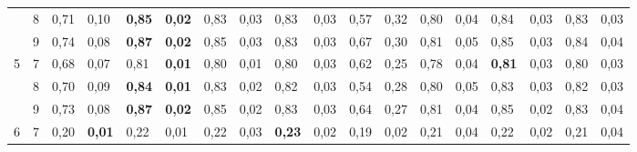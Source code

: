 \documentclass[conference]{IEEEtran}
\begin{document}
\begin{table}[]
\begin{tabular}{|cl|ll|ll|ll|ll|ll|ll|ll|ll|}
		\multicolumn{1}{|c|}{}                    & 8 & \multicolumn{1}{l|}{0,71} & 0,10          & \multicolumn{1}{l|}{\textbf{0,85}} & \textbf{0,02} & \multicolumn{1}{l|}{0,83}          & 0,03 & \multicolumn{1}{l|}{0,83}          & 0,03 & \multicolumn{1}{l|}{0,57}                 & 0,32 & \multicolumn{1}{l|}{0,80} & 0,04 & \multicolumn{1}{l|}{0,84}          & 0,03          & \multicolumn{1}{l|}{0,83}          & 0,03          \\ \cline{2-18} 
		\multicolumn{1}{|c|}{}                    & 9 & \multicolumn{1}{l|}{0,74} & 0,08          & \multicolumn{1}{l|}{\textbf{0,87}} & \textbf{0,02} & \multicolumn{1}{l|}{0,85}          & 0,03 & \multicolumn{1}{l|}{0,83}          & 0,03 & \multicolumn{1}{l|}{0,67}                 & 0,30 & \multicolumn{1}{l|}{0,81} & 0,05 & \multicolumn{1}{l|}{0,85}          & 0,03          & \multicolumn{1}{l|}{0,84}          & 0,04          \\ \hline
		\multicolumn{1}{|c|}{\multirow{3}{*}{5}}  & 7 & \multicolumn{1}{l|}{0,68} & 0,07          & \multicolumn{1}{l|}{0,81}          & \textbf{0,01} & \multicolumn{1}{l|}{0,80}          & 0,01 & \multicolumn{1}{l|}{0,80}          & 0,03 & \multicolumn{1}{l|}{0,62}                 & 0,25 & \multicolumn{1}{l|}{0,78} & 0,04 & \multicolumn{1}{l|}{\textbf{0,81}} & 0,03          & \multicolumn{1}{l|}{0,80}          & 0,03          \\ \cline{2-18} 
		\multicolumn{1}{|c|}{}                    & 8 & \multicolumn{1}{l|}{0,70} & 0,09          & \multicolumn{1}{l|}{\textbf{0,84}} & \textbf{0,01} & \multicolumn{1}{l|}{0,83}          & 0,02 & \multicolumn{1}{l|}{0,82}          & 0,03 & \multicolumn{1}{l|}{0,54}                 & 0,28 & \multicolumn{1}{l|}{0,80} & 0,05 & \multicolumn{1}{l|}{0,83}          & 0,03          & \multicolumn{1}{l|}{0,82}          & 0,03          \\ \cline{2-18} 
		\multicolumn{1}{|c|}{}                    & 9 & \multicolumn{1}{l|}{0,73} & 0,08          & \multicolumn{1}{l|}{\textbf{0,87}} & \textbf{0,02} & \multicolumn{1}{l|}{0,85}          & 0,02 & \multicolumn{1}{l|}{0,83}          & 0,03 & \multicolumn{1}{l|}{0,64}                 & 0,27 & \multicolumn{1}{l|}{0,81} & 0,04 & \multicolumn{1}{l|}{0,85}          & 0,02          & \multicolumn{1}{l|}{0,83}          & 0,04          \\ \hline
		\multicolumn{1}{|c|}{\multirow{3}{*}{6}}  & 7 & \multicolumn{1}{l|}{0,20} & \textbf{0,01} & \multicolumn{1}{l|}{0,22}          & 0,01          & \multicolumn{1}{l|}{0,22}          & 0,03 & \multicolumn{1}{l|}{\textbf{0,23}} & 0,02 & \multicolumn{1}{l|}{0,19}                 & 0,02 & \multicolumn{1}{l|}{0,21} & 0,04 & \multicolumn{1}{l|}{0,22}          & 0,02          & \multicolumn{1}{l|}{0,21}          & 0,04          \\ \cline{2-18} 

\end{tabular}
\end{table}
\end{document}
